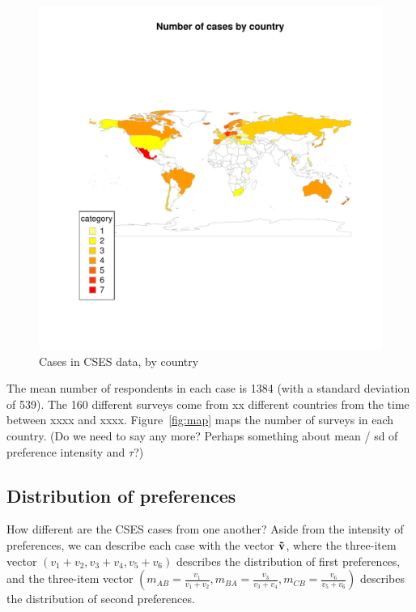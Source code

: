 \documentclass[11pt, letter]{article}
\begin{document}
\begin{figure}[!htb]
	\centering
	\includegraphics[width = .8 \textwidth]{../output/figures/case_map.pdf}
	\caption{Cases in CSES data, by country}
	\label{fig:case_map}
\end{figure}

The mean number of respondents in each case is 1384 (with a standard deviation of 539). The 160 different surveys come from xx different countries from the time between xxxx and xxxx. Figure~\ref{fig:map} maps the number of surveys in each country. (Do we need to say any more? Perhaps something about mean / sd of preference intensity and $\tau$?)

\subsection{Distribution of preferences} 

How different are the CSES cases from one another? Aside from the intensity of preferences, we can describe each case with the vector $\bf \tilde{v}$, where the three-item vector $(v_1 + v_2, v_3 + v_4, v_5 + v_6)$ describes the distribution of first preferences, and the three-item vector $(m_{AB} = \frac{v_1}{v_1 + v_2}, m_{BA} = \frac{v_3}{v_3 + v_4}, m_{CB} = \frac{v_6}{v_5 + v_6})$ describes the distribution of second preferences. 
\end{document}
